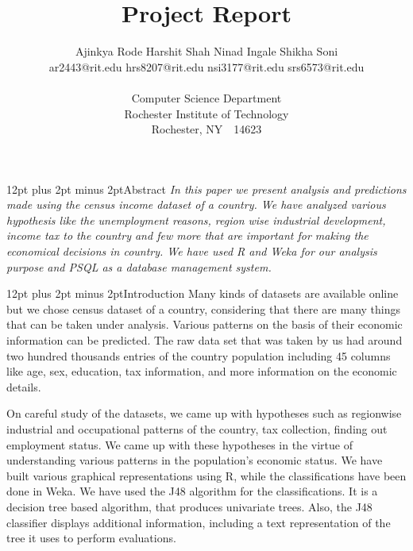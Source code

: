 \documentclass[9pt, twocolumn]{article}
\makeatletter
\def\section{\@startsection {section}{1}{\z@}{24pt plus 2pt minus 2pt}
{12pt plus 2pt minus 2pt}{\large\bf}}
\makeatother
\begin{document}
\date{}

\title{\Large\bf Project Report}

\author{
 Ajinkya Rode\hspace{11mm}  Harshit Shah \hspace{11mm}  Ninad Ingale\hspace{11mm} Shikha Soni\\
 ar2443@rit.edu\hspace{5mm} hrs8207@rit.edu\hspace{5mm}  nsi3177@rit.edu\hspace{5mm} srs6573@rit.edu\\
\\
 Computer Science Department\\
 Rochester Institute of Technology\\
 Rochester, NY~~14623
}

\maketitle

\thispagestyle{empty}



\section{Abstract}
{\em
In this paper we present analysis and predictions made using the census income dataset of a country. We have analyzed various hypothesis like the unemployment reasons, region wise industrial development, income tax to the country and few more that are important for making the economical decisions in country. We have used R and Weka for our analysis purpose and PSQL as a database management system. 
}

\section{Introduction}
Many kinds of datasets are available online but we chose census dataset of a country, considering that there are many things that can be taken under analysis. Various patterns on the basis of their economic information can be predicted. The raw data set that was taken by us had around two hundred thousands entries of the country population including 45 columns like age, sex, education, tax information, and more information on the economic details. 

On careful study of the datasets, we came up with hypotheses such as regionwise industrial and occupational patterns of the country, tax collection, finding out employment status. We came up with these hypotheses in the virtue of understanding various patterns in the population’s economic status. We have built various graphical representations using R, while the classifications have been done in Weka. We have used the J48 algorithm for the classifications. It is a decision tree based algorithm, that produces univariate trees. Also, the J48 classifier displays additional information, including a text representation of the tree it uses to perform evaluations.
\end{document}
